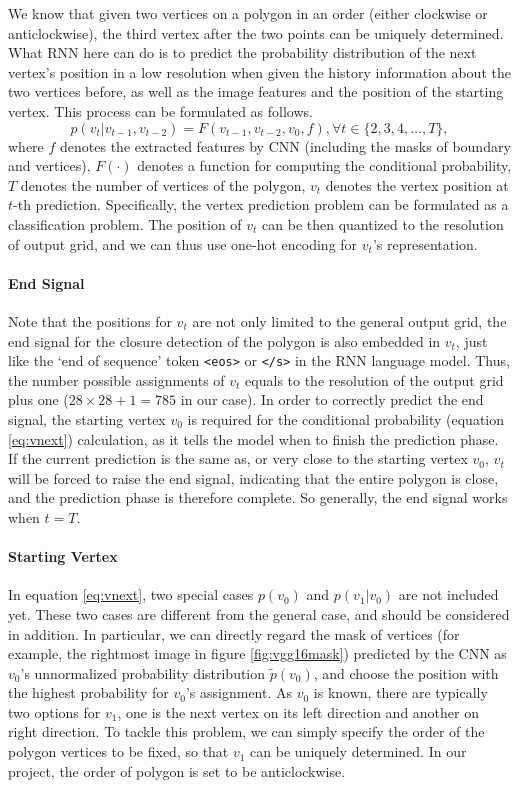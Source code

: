 We know that given two vertices on a polygon in an order (either clockwise or anticlockwise), the third vertex after the two points can be uniquely determined. What RNN here can do is to predict the probability distribution of the next vertex's position in a low resolution when given the history information about the two vertices before, as well as the image features and the position of the starting vertex. This process can be formulated as follows.
\begin{equation}\label{eq:vnext}
	p(v_t|v_{t-1}, v_{t-2}) = F(v_{t-1}, v_{t-2}, v_0, f), \forall t \in \{2,3,4,\ldots,T\},
\end{equation}
where $f$ denotes the extracted features by CNN (including the masks of boundary and vertices), $F(\cdot)$ denotes a function for computing the conditional probability, $T$ denotes the number of vertices of the polygon, $v_t$ denotes the vertex position at $t$-th prediction. Specifically, the vertex prediction problem can be formulated as a classification problem. The position of $v_t$ can be then quantized to the resolution of output grid, and we can thus use one-hot encoding for $v_t$'s representation.

\paragraph{End Signal} Note that the positions for $v_t$ are not only limited to the general output grid, the end signal for the closure detection of the polygon is also embedded in $v_t$, just like the `end of sequence' token \lstinline{<eos>} or \lstinline{</s>} in the RNN language model. Thus, the number possible assignments of $v_t$ equals to the resolution of the output grid plus one ($28\times28+1=785$ in our case). In order to correctly predict the end signal, the starting vertex $v_0$ is required for the conditional probability (equation \ref{eq:vnext}) calculation, as it tells the model when to finish the prediction phase. If the current prediction is the same as, or very close to the starting vertex $v_0$, $v_t$ will be forced to raise the end signal, indicating that the entire polygon is close, and the prediction phase is therefore complete. So generally, the end signal works when $t=T$.

\paragraph{Starting Vertex} In equation \ref{eq:vnext}, two special cases $p(v_0)$ and $p(v_1|v_0)$ are not included yet. These two cases are different from the general case, and should be considered in addition. In particular, we can directly regard the mask of vertices (for example, the rightmost image in figure \ref{fig:vgg16mask}) predicted by the CNN as $v_0$'s unnormalized probability distribution $\tilde{p}(v_0)$, and choose the position with the highest probability for $v_0$'s assignment. As $v_0$ is known, there are typically two options for $v_1$, one is the next vertex on its left direction and another on right direction. To tackle this problem, we can simply specify the order of the polygon vertices to be fixed, so that $v_1$ can be uniquely determined. In our project, the order of polygon is set to be anticlockwise.

